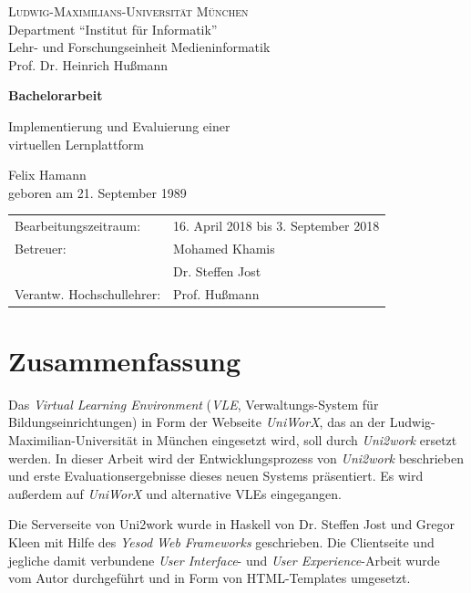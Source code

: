 \documentclass[11pt,a4paper,twoside,ngerman]{article}
\begin{document}
\pagestyle{empty} %

\begin{center}
\textsc{Ludwig-Maximilians-Universität München}\\
Department "`Institut für Informatik"'\\
Lehr- und Forschungseinheit Medieninformatik\\
Prof. Dr. Heinrich Hußmann

\vspace{5cm}
{\large\textbf{Bachelorarbeit}}\vspace{.5cm}

{\LARGE Implementierung und Evaluierung einer\\virtuellen Lernplattform}
\vspace{1cm}

{\large Felix Hamann}\\
geboren am 21. September 1989

\end{center}
\vfill

\begin{tabular}{ll}
Bearbeitungszeitraum: & 16. April 2018 bis 3. September 2018\\
Betreuer: & Mohamed Khamis\\
& Dr. Steffen Jost\\
Verantw. Hochschullehrer: & Prof. Hußmann
\end{tabular}


\clearpage
\section*{Zusammenfassung}

Das \textit{Virtual Learning Environment} (\textit{VLE}, Verwaltungs-System für Bildungseinrichtungen) in Form der Webseite \textit{UniWorX}, das an der Ludwig-Maximilian-Universität in München eingesetzt wird, soll durch \textit{Uni2work} ersetzt werden. In dieser Arbeit wird der Entwicklungsprozess von \textit{Uni2work} beschrieben und erste Evaluationsergebnisse dieses neuen Systems präsentiert. Es wird außerdem auf \textit{UniWorX} und alternative VLEs eingegangen.

Die Serverseite von Uni2work wurde in Haskell von Dr. Steffen Jost und Gregor Kleen mit Hilfe des \textit{Yesod Web Frameworks} geschrieben. Die Clientseite und jegliche damit verbundene \textit{User Interface}- und \textit{User Experience}-Arbeit wurde vom Autor durchgeführt und in Form von HTML-Templates umgesetzt. 
\end{document}
